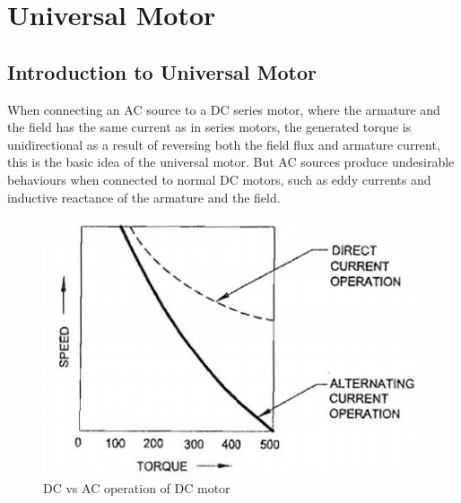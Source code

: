 \documentclass[journal]{IEEEtran}
\begin{document}

\section{Universal Motor}
\subsection{Introduction to Universal Motor}
When connecting an AC source to a DC series motor, where the armature and the field has the same current as in series motors, the generated torque is unidirectional as a result of reversing both the field flux and armature current, this is the basic idea of the universal motor. But AC sources produce undesirable behaviours when connected to normal DC motors, such as eddy currents and inductive reactance of the armature and the field.\cite{chapman2005}

\begin{figure}[h]
    \centering
    \includegraphics[scale=0.6]{universal/DC vs universal_google.jpg}
    \caption{DC vs AC operation of DC motor}
    \label{fig:DC vs uni}
\end{figure}
\end{document}
